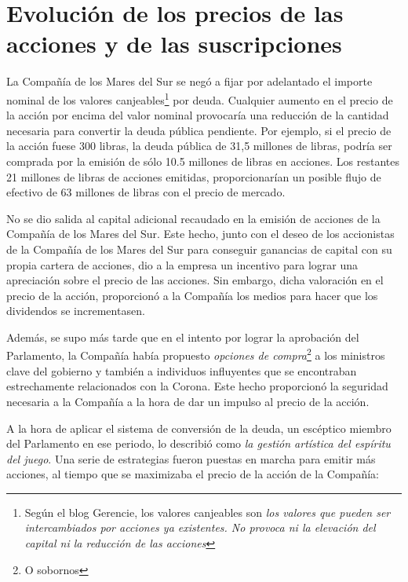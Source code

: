 \section{Evolución de los precios de las acciones y de las suscripciones}

La Compañía de los Mares del Sur se negó a fijar por adelantado el importe nominal de los valores canjeables\footnote{Según el blog Gerencie, los valores canjeables son \emph{los valores que pueden ser intercambiados por acciones ya existentes. No provoca ni la elevación del capital ni la reducción de las acciones}} por deuda. Cualquier aumento en el precio de la acción por encima del valor nominal provocaría una reducción de la cantidad necesaria para convertir la deuda pública pendiente. Por ejemplo, si el precio de la acción fuese 300 libras, la deuda pública de 31,5 millones de libras, podría ser comprada por la emisión de sólo 10.5 millones de libras en acciones. Los restantes 21 millones de libras de acciones emitidas, proporcionarían un posible flujo de efectivo de 63 millones de libras con el precio de mercado. 

No se dio salida al capital adicional recaudado en la emisión de acciones de la Compañía de los Mares del Sur. Este hecho, junto con el deseo de los accionistas de la Compañía de los Mares del Sur para conseguir ganancias de capital con su propia cartera de acciones, dio a la empresa un incentivo para lograr una apreciación sobre el precio de las acciones. Sin embargo, dicha valoración en el precio de la acción, proporcionó a la Compañía los medios para hacer que los dividendos se incrementasen. 

Además, se supo más tarde que en el intento por lograr la aprobación del Parlamento, la Compañía había propuesto \emph{opciones de compra}\footnote{O sobornos} a los ministros clave del gobierno y también a individuos influyentes que se encontraban estrechamente relacionados con la Corona. Este hecho proporcionó la seguridad necesaria a la Compañía a la hora de dar un impulso al precio de la acción.

A la hora de aplicar el sistema de conversión de la deuda, un escéptico miembro del Parlamento en ese periodo, lo describió como \emph{la gestión artística del espíritu del juego}. Una serie de estrategias fueron puestas en marcha para emitir más acciones, al tiempo que se maximizaba el precio de la acción de la Compañía:

